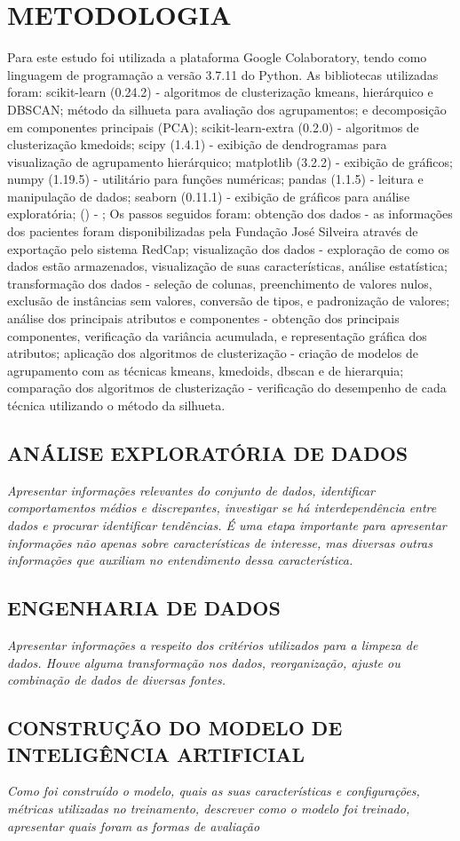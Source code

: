 \chapter{METODOLOGIA}

Para este estudo foi utilizada a plataforma Google Colaboratory, tendo como linguagem de programação a versão 3.7.11 do Python. As bibliotecas utilizadas foram:
scikit-learn (0.24.2) - algoritmos de clusterização kmeans, hierárquico e DBSCAN; método da silhueta para avaliação dos agrupamentos; e decomposição em componentes principais (PCA);
scikit-learn-extra (0.2.0) - algoritmos de clusterização kmedoids;
scipy (1.4.1) - exibição de dendrogramas para visualização de agrupamento hierárquico;
matplotlib (3.2.2) - exibição de gráficos;
numpy (1.19.5) - utilitário para funções numéricas;
pandas (1.1.5) - leitura e manipulação de dados;
seaborn (0.11.1) - exibição de gráficos para análise exploratória;
  () - ;
Os passos seguidos foram:
obtenção dos dados - as informações dos pacientes foram disponibilizadas pela Fundação José Silveira através de exportação pelo sistema RedCap;
visualização dos dados - exploração de como os dados estão armazenados, visualização de suas características, análise estatística;
transformação dos dados - seleção de colunas, preenchimento de valores nulos, exclusão de instâncias sem valores, conversão de tipos, e padronização de valores;
análise dos principais atributos e componentes - obtenção dos principais componentes, verificação da variância acumulada, e representação gráfica dos atributos;
aplicação dos algoritmos de clusterização - criação de modelos de agrupamento com as técnicas kmeans, kmedoids, dbscan e de hierarquia;
comparação dos algoritmos de clusterização - verificação do desempenho de cada técnica utilizando o método da silhueta.

\section{ANÁLISE EXPLORATÓRIA DE DADOS}
\textit{Apresentar informações relevantes do conjunto de dados, identificar comportamentos médios e discrepantes, investigar se há interdependência entre dados e procurar identificar tendências. É uma etapa importante para apresentar informações não apenas sobre características de interesse, mas diversas outras informações que auxiliam no entendimento dessa característica.}

\section{ENGENHARIA DE DADOS}
\textit{Apresentar informações a respeito dos critérios utilizados para a limpeza de dados. Houve alguma transformação nos dados, reorganização, ajuste ou combinação de dados de diversas fontes.}

\section{CONSTRUÇÃO DO MODELO DE INTELIGÊNCIA ARTIFICIAL}
\textit{Como foi construído o modelo, quais as suas características e configurações, métricas utilizadas no treinamento, descrever como o modelo foi treinado, apresentar quais foram as formas de avaliação}
